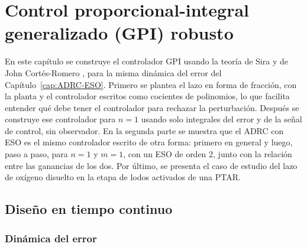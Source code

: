 \chapter{Control proporcional-integral generalizado (GPI) robusto}
\label{cap:GPI}

En este capítulo se construye el controlador GPI usando la teoría de Sira \cite{fliess2002gpi,sira2017adrc} y de John Cortés-Romero \cite{cortes2014gpi},
para la misma dinámica del error del Capítulo~\ref{cap:ADRC-ESO}. Primero se plantea el lazo en forma de fracción,
con la planta y el controlador escritos como cocientes de polinomios, lo que facilita 
entender qué debe tener el controlador para rechazar la perturbación. Después se
construye ese controlador para $n = 1$ usando solo integrales del error y de la
señal de control, sin observador. En la segunda parte se muestra que el ADRC
con ESO es el mismo controlador escrito de otra forma: primero en general y
luego, paso a paso, para $n = 1$ y $m = 1$, con un ESO de orden 2, junto con la
relación entre las ganancias de los dos. Por último, se presenta el caso de estudio del lazo de oxígeno
disuelto en la etapa de lodos activados de una PTAR.

\section{Diseño en tiempo continuo}
\label{sec:gpi_continuo}

\subsection{Dinámica del error}
\label{subsec:gpi_error}

